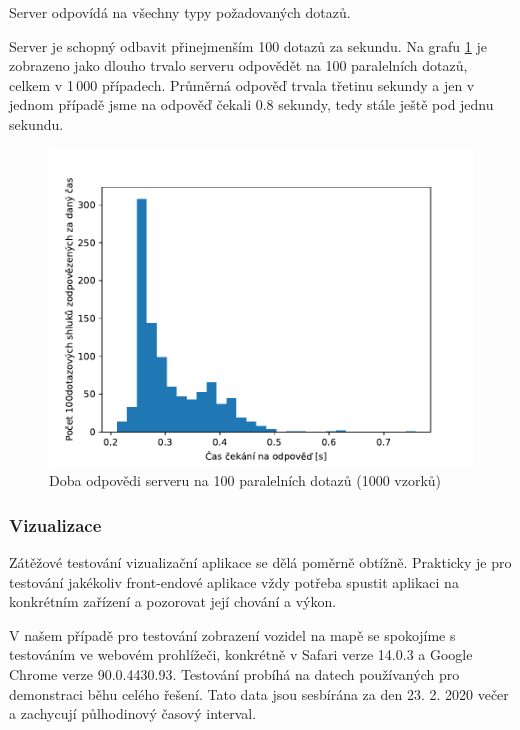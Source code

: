 Server odpovídá na všechny typy požadovaných dotazů.


\bigbreak


Server je schopný odbavit přinejmenším 100 dotazů za sekundu. Na grafu \ref{fig:server_response_time} je zobrazeno jako dlouho trvalo serveru odpovědět na 100 paralelních dotazů, celkem v 1\,000 případech. Průměrná odpověď trvala třetinu sekundy a jen v jednom případě jsme na odpověď čekali 0.8 sekundy, tedy stále ještě pod jednu sekundu.


\begin{figure}
   \centering
 \includegraphics[width=\linewidth]{../img/server_response_time}
 \caption{Doba odpovědi serveru na 100 paralelních dotazů (1000 vzorků)}
 \label{fig:server_response_time}
\end{figure}


\subsubsection{Vizualizace}


Zátěžové testování vizualizační aplikace se dělá poměrně obtížně. Prakticky je pro testování jakékoliv front-endové aplikace vždy potřeba spustit aplikaci na konkrétním zařízení a pozorovat její chování a výkon.


\bigbreak


V našem případě pro testování zobrazení vozidel na mapě se spokojíme s testováním ve webovém prohlížeči, konkrétně v Safari verze 14.0.3 a Google Chrome verze 90.0.4430.93. Testování probíhá na datech používaných pro demonstraci běhu celého řešení. Tato data jsou sesbírána za den 23. 2. 2020 večer a zachycují půlhodinový časový interval.


